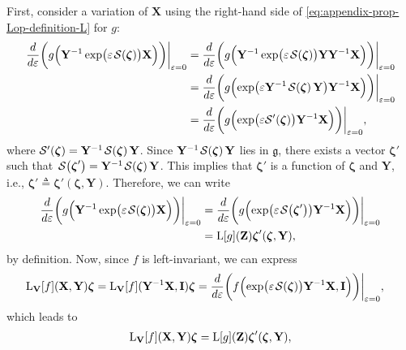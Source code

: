 First, consider a variation of $\mathbf{X}$ using the right-hand side of \eqref{eq:appendix-prop-Lop-definition-L} for $g$:
\begin{align}
    \frac{d}{d\varepsilon}\biggl(g\Bigl(\mathbf{Y}^{-1}\exp\bigl(\varepsilon\SL[\boldsymbol{\zeta}]\bigr)\mathbf{X}\Bigr)\biggr)\biggr|_{\varepsilon=0} &= \frac{d}{d\varepsilon}\biggl(g\Bigl(\mathbf{Y}^{-1}\exp\bigl(\varepsilon\SL[\boldsymbol{\zeta}]\bigr)\mathbf{Y}\mathbf{Y}^{-1}\mathbf{X}\Bigr)\biggr)\biggr|_{\varepsilon=0}\\
    &= \frac{d}{d\varepsilon}\biggl(g\Bigl(\exp\bigl(\varepsilon\mathbf{Y}^{-1}\SL[\boldsymbol{\zeta}]\mathbf{Y}\bigr)\mathbf{Y}^{-1}\mathbf{X}\Bigr)\biggr)\biggr|_{\varepsilon=0} \\
    &= \frac{d}{d\varepsilon}\biggl(g\Bigl(\exp\bigl(\varepsilon\mathcal{S}'(\boldsymbol{\zeta})\bigr)\mathbf{Y}^{-1}\mathbf{X}\Bigr)\biggr)\biggr|_{\varepsilon=0},
\end{align}
where $\mathcal{S}'(\boldsymbol{\zeta}) = \mathbf{Y}^{-1}\SL[\boldsymbol{\zeta}]\mathbf{Y}$. Since $\mathbf{Y}^{-1}\SL[\boldsymbol{\zeta}]\mathbf{Y}$ lies in $\mathfrak{g}$, there exists a vector $\boldsymbol{\zeta}'$ such that $\SL[\boldsymbol{\zeta}'] = \mathbf{Y}^{-1}\SL[\boldsymbol{\zeta}]\mathbf{Y}$. This implies that $\boldsymbol{\zeta}'$ is a function of $\boldsymbol{\zeta}$ and $\mathbf{Y}$, i.e., $\boldsymbol{\zeta}' \triangleq \boldsymbol{\zeta}'(\boldsymbol{\zeta}, \mathbf{Y})$. Therefore, we can write
\begin{align}
    \frac{d}{d\varepsilon}\biggl(g\Bigl(\mathbf{Y}^{-1}\exp\bigl(\varepsilon\SL[\boldsymbol{\zeta}]\bigr)\mathbf{X}\Bigr)\biggr)\biggr|_{\varepsilon=0} &= \frac{d}{d\varepsilon}\biggl(g\Bigl(\exp\bigl(\varepsilon\SL[\boldsymbol{\zeta}']\bigr)\mathbf{Y}^{-1}\mathbf{X}\Bigr)\biggr)\biggr|_{\varepsilon=0}\\
    &= \Lop[g](\mathbf{Z})\boldsymbol{\zeta}'(\boldsymbol{\zeta}, \mathbf{Y}) \label{appendix-prop-Lop-chain-rule-LgZ-zeta-prime},
\end{align}
by definition. Now, since $f$ is left-invariant, we can express
\begin{align}
    \Lop_\mathbf{V}[f](\mathbf{X}, \mathbf{Y})\boldsymbol{\zeta} &= 
    \Lop_\mathbf{V}[f](\mathbf{Y}^{-1}\mathbf{X}, \mathbf{I})\boldsymbol{\zeta}
    = \frac{d}{d\varepsilon}\biggl(f\Bigl(\exp\bigl(\varepsilon\SL[\boldsymbol{\zeta}]\bigr)\mathbf{Y}^{-1}\mathbf{X}, \mathbf{I}\Bigr)\biggr)\biggr|_{\varepsilon=0},
\end{align}
which leads to
\begin{align}
    \operatorname{L}_\mathbf{V}[f](\mathbf{X}, \mathbf{Y})\boldsymbol{\zeta} = \operatorname{L}[g](\mathbf{Z})\boldsymbol{\zeta}'(\boldsymbol{\zeta}, \mathbf{Y}) \label{app:prop-Lop-chain-rule-LVf-final-form},
\end{align}
